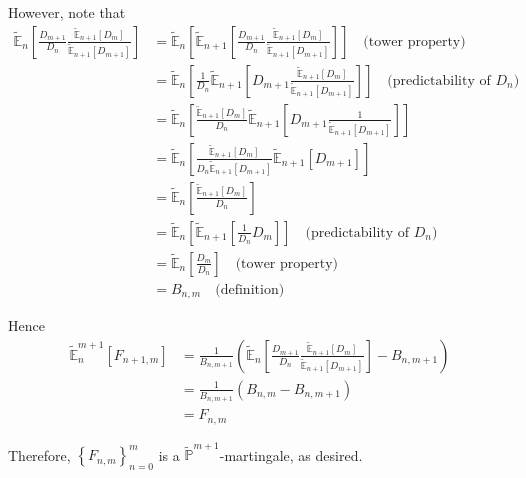 \documentclass[12pt]{article}
\renewcommand{\P}{\mathbb P}
\newcommand{\E}{\mathbb E}
\begin{document}
However, note that
\begin{align*}
	\tilde{\E}_n \left[ \frac{D_{m + 1}}{D_n} \frac{ \tilde{\E}_{n + 1} \left[ D_m \right] }{ \tilde{\E}_{n + 1} \left[ D_{m + 1} \right] } \right] &= \tilde{\E}_n \left[ \tilde{\E}_{n + 1} \left[ \frac{D_{m + 1}}{D_n} \frac{ \tilde{\E}_{n + 1} \left[ D_m \right] }{ \tilde{\E}_{n + 1} \left[ D_{m + 1} \right] } \right] \right] \quad \text{(tower property)} \\
	&= \tilde{\E}_n \left[ \frac{1}{D_n} \tilde{\E}_{n + 1} \left[ D_{m + 1} \frac{ \tilde{\E}_{n + 1} \left[ D_m \right] }{ \tilde{\E}_{n + 1} \left[ D_{m + 1} \right] } \right] \right] \quad \text{(predictability of $D_n$)} \\
	&= \tilde{\E}_n \left[ \frac{ \tilde{\E}_{n + 1} \left[ D_m \right] }{D_n} \tilde{\E}_{n + 1} \left[ D_{m + 1} \frac{ 1 }{ \tilde{\E}_{n + 1} \left[ D_{m + 1} \right] } \right] \right] \\
	&= \tilde{\E}_n \left[ \frac{ \tilde{\E}_{n + 1} \left[ D_m \right] }{ D_n \tilde{\E}_{n + 1} \left[ D_{m + 1} \right]  } \tilde{\E}_{n + 1} \left[ D_{m + 1} \right] \right] \\
	&= \tilde{\E}_n \left[ \frac{ \tilde{\E}_{n + 1} \left[ D_m \right] }{ D_n } \right] \\
	&= \tilde{\E}_n \left[ \tilde{\E}_{n + 1} \left[ \frac{1}{D_n} D_m \right] \right] \quad \text{(predictability of $D_n$)} \\
	&= \tilde{\E}_n \left[ \frac{D_m}{D_n} \right] \quad \text{(tower property)} \\	
	&= B_{n,m} \quad \text{(definition)}
\end{align*}

Hence
\begin{align*}
	\tilde{\E}^{m + 1}_n \left[ F_{n + 1,m} \right] &= \frac{ 1 }{B_{n, m  +1}} \left( \tilde{\E}_n \left[ \frac{D_{m + 1}}{D_n} \frac{ \tilde{\E}_{n + 1} \left[ D_m \right] }{ \tilde{\E}_{n + 1} \left[ D_{m + 1} \right] } \right] - B_{n,m + 1} \right) \\
	&= \frac{ 1 }{B_{n, m  +1}} \left( B_{n, m} - B_{n,m + 1} \right) \\
	&= F_{n,m}
\end{align*}

Therefore, $\left\{ F_{n,m} \right\}^m_{n = 0}$ is a $\tilde{\P}^{m + 1}$-martingale, as desired.
\end{document}
